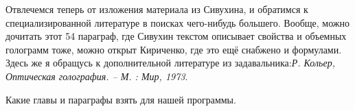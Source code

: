 Отвлечемся теперь от изложения материала из Сивухина, и обратимся к специализированной литературе в поисках чего-нибудь большего.
Вообще, можно дочитать этот 54 параграф, где Сивухин текстом описывает свойства и объемных голограмм тоже, можно открыт Кириченко, где это ещё снабжено и формулами. 
Здесь же я обращусь к дополнительной литературе из задавальника:\textit{Р. Кольер, Оптическая голография. – М. : Мир, 1973}.

Какие главы и параграфы взять для нашей программы.